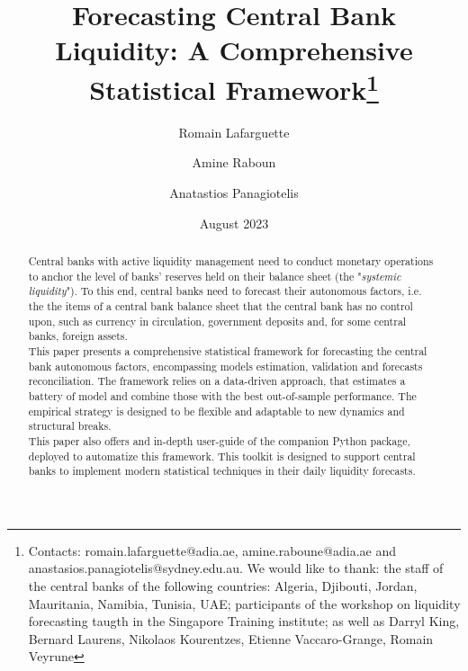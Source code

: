 \documentclass{article}
\begin{document}
\title{Forecasting Central Bank Liquidity: A Comprehensive Statistical Framework\thanks{
    Contacts:  romain.lafarguette@adia.ae,
amine.raboune@adia.ae and anastasios.panagiotelis@sydney.edu.au. We would like to thank: the staff of the central banks
of the  following countries:  Algeria, Djibouti, Jordan,  Mauritania, Namibia, Tunisia, 
UAE;  participants of  the workshop  on  liquidity forecasting  taugth in  the
Singapore  Training  institute;  as  well as  Darryl  King,  Bernard  Laurens,
Nikolaos Kourentzes, Etienne Vaccaro-Grange, Romain Veyrune}}

\author[$\ddag$]{Romain Lafarguette}
\author[$\ddag$]{Amine Raboun}
\author[*]{Anatastios Panagiotelis}
\date{August 2023}
\maketitle

\begin{abstract}          
Central  banks  with active  liquidity  management  need to  conduct  monetary
operations to anchor the level of  banks' reserves held on their balance sheet
(the  "\emph{systemic  liquidity}").   To  this end,  central  banks  need  to
forecast  their autonomous  factors,  i.e. the  the items  of  a central  bank
balance sheet that the  central bank has no control upon,  such as currency in
circulation,  government  deposits  and,   for  some  central  banks,  foreign
assets.\\

This paper presents a comprehensive  statistical framework for forecasting the
central bank  autonomous factors,  encompassing models  estimation, validation
and forecasts reconciliation. The framework  relies on a data-driven approach,
that  estimates  a   battery  of  model  and  combine  those   with  the  best
out-of-sample performance. The  empirical strategy is designed  to be flexible
and adaptable to new dynamics and structural breaks.\\

This  paper  also offers  and  in-depth  user-guide  of the  companion  Python
package, deployed  to automatize this  framework. This toolkit is  designed to
support  central banks  to implement  modern statistical  techniques in  their
daily liquidity forecasts.\\
\end{abstract}
\newpage


\newpage
\end{document}

